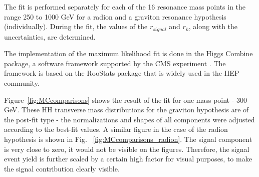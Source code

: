 \begin{small}
The fit is performed separately for each of the 16 resonance mass points in the range 250 to 1000 GeV for a radion and a graviton resonance hypothesis (individually). During the fit, the values of the $r_{signal}$ and $r_k$, along with the uncertainties, are determined. 

The implementation of the maximum likelihood fit is done in the Higgs Combine package, a software framework supported by the CMS experiment \cite{HiggsCombine}. The framework is based on the RooStats package \cite{RooStats} that is widely used in the HEP community. 

Figure~\ref{fig:MCcomparisons} shows the result of the fit for one mass point - 300 GeV. These HH transverse mass distributions for the graviton hypothesis are of the post-fit type - the normalizations and shapes of all components were adjusted according to the best-fit values. A similar figure in the case of the radion hypothesis is shown in Fig. ~\ref{fig:MCcomparisons_radion}.  The signal component is very close to zero, it would not be visible on the figures. Therefore, the signal event yield is further scaled by a certain high factor for visual purposes, to make the signal contribution clearly visible.                                                                                                                                                                                                                                                                                                                                                                                                                                                                                                                                                                                                                                                                                             


\end{small}
